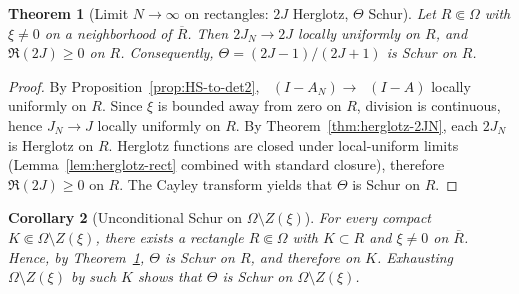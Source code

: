 \documentclass[11pt]{article}
\newtheorem{theorem}{Theorem}
\newtheorem{corollary}[theorem]{Corollary}
\theoremstyle{remark}
\DeclareMathOperator{\dettwo}{det_2}
\begin{document}
\begin{theorem}[Limit \(N\to\infty\) on rectangles: \(2J\) Herglotz, \(\Theta\) Schur]\label{thm:limit-rect}
Let \(R\Subset\Omega\) with \(\xi\neq 0\) on a neighborhood of \(\overline R\). Then \(2J_N\to 2J\) locally uniformly on \(R\), and \(\Re(2J)\ge 0\) on \(R\). Consequently, \(\Theta=(2J-1)/(2J+1)\) is Schur on \(R\).
\end{theorem}
\begin{proof}
By Proposition~\ref{prop:HS-to-det2}, \(\dettwo(I-A_N)\to \dettwo(I-A)\) locally uniformly on \(R\). Since \(\xi\) is bounded away from zero on \(R\), division is continuous, hence \(J_N\to J\) locally uniformly on \(R\). By Theorem~\ref{thm:herglotz-2JN}, each \(2J_N\) is Herglotz on \(R\). Herglotz functions are closed under local-uniform limits (Lemma~\ref{lem:herglotz-rect} combined with standard closure), therefore \(\Re(2J)\ge 0\) on \(R\). The Cayley transform yields that \(\Theta\) is Schur on \(R\).
\end{proof}

\begin{corollary}[Unconditional Schur on \(\Omega\setminus Z(\xi)\)]\label{cor:Schur-off-zeros}
For every compact \(K\Subset \Omega\setminus Z(\xi)\), there exists a rectangle \(R\Subset\Omega\) with \(K\subset R\) and \(\xi\neq 0\) on \(\overline R\). Hence, by Theorem~\ref{thm:limit-rect}, \(\Theta\) is Schur on \(R\), and therefore on \(K\). Exhausting \(\Omega\setminus Z(\xi)\) by such \(K\) shows that \(\Theta\) is Schur on \(\Omega\setminus Z(\xi)\).
\end{corollary}
\end{document}
